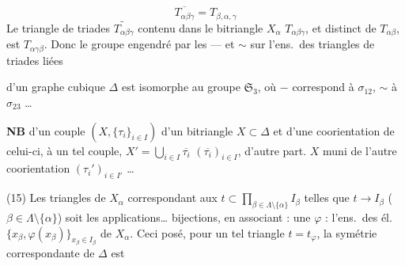 \documentclass[11pt,a4paper]{article}
\begin{document}

\[
\overline{T_{\alpha\beta\gamma}} = T_{\beta,\alpha,\gamma}
\]
Le triangle de triades $\widetilde{T_{\alpha\beta\gamma}}$ \struck{\ill{}} contenu
dans le bitriangle $X_\alpha$  \struck{\ill{}} $T_{\alpha\beta\gamma}$,
et distinct de $T_{\alpha\beta}$, est $T_{\alpha\gamma\beta}$. Donc
le groupe engendré par les  --- et
$\sim$ sur l'ens.\ des triangles de triades liées

d'un graphe cubique $\Delta$ est isomorphe au
groupe $\mathfrak{S}_3$, où $-$ correspond à $\sigma_{12}$,
$\sim$ à $\sigma_{23}$ …

\textbf{NB}  d'un couple $(X, \{\tau_i\}_{i\in I})$
d'un bitriangle $X \subset \Delta$ et d'une coorientation
de celui-ci,   
à un tel couple,   
 $X' = \bigcup_{i\in I} \overline{\tau_i}$ 
$(\overline{\tau_i})_{i\in I}$, d'autre part. $X$ muni de
l'autre coorientation $(\tau_i')_{i\in I'}$ …

 \struck{\ill{}}
(15) Les triangles de $X_\alpha$ correspondant aux
 $t \subset \prod_{\beta\in\Lambda\setminus\{\alpha\}} I_\beta$  telles que
$t \to I_\beta$ ($\beta \in \Lambda\setminus\{\alpha\}$) soit
les applications…  \struck{\ill{}}
bijections, en associant : une
  $\varphi$ : \struck{\ill{}} l'ens.\ des él.\ $\{x_\beta, \varphi(x_\beta)\}_{x_\beta\in I_\beta}$
de $X_\alpha$. Ceci posé, pour un tel triangle
$t = t_\varphi$, la symétrie correspondante de $\Delta$ est
\end{document}
